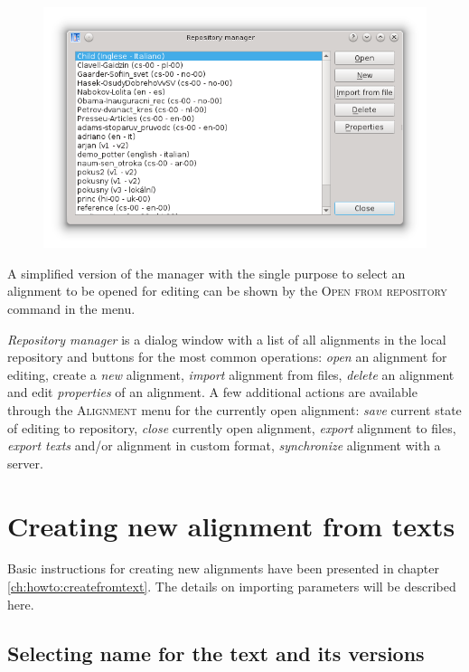 \documentclass[a4paper,10pt,oneside]{book}
\newcommand{\menu}[1]{\textsc{#1}}
\begin{document}
\begin{figure}[htb]
 \includegraphics[width=\textwidth]{screenshots/rep_manager.png}
\end{figure}

A simplified version of the manager with the single purpose to select an alignment to be opened for editing can be shown by the \menu{Open from repository} command in the menu.

\emph{Repository manager} is a dialog window with a list of all alignments in the local repository and buttons for the most common operations: \emph{open} an alignment for editing, create a \emph{new} alignment, \emph{import} alignment from files, \emph{delete} an alignment and edit \emph{properties} of an alignment. A few additional actions are available through the \menu{Alignment} menu for the currently open alignment: \emph{save} current state of editing to repository, \emph{close} currently open alignment, \emph{export} alignment to files, \emph{export texts} and/or alignment in custom format, \emph{synchronize} alignment with a server.

\section{Creating new alignment from texts}\label{ch:detail:managing_local:new}

Basic instructions for creating new alignments have been presented in chapter \ref{ch:howto:createfromtext}. The details on importing parameters will be described here.

\subsection{Selecting name for the text and its versions}\label{ch:detail:managing_local:new:names}
\end{document}

